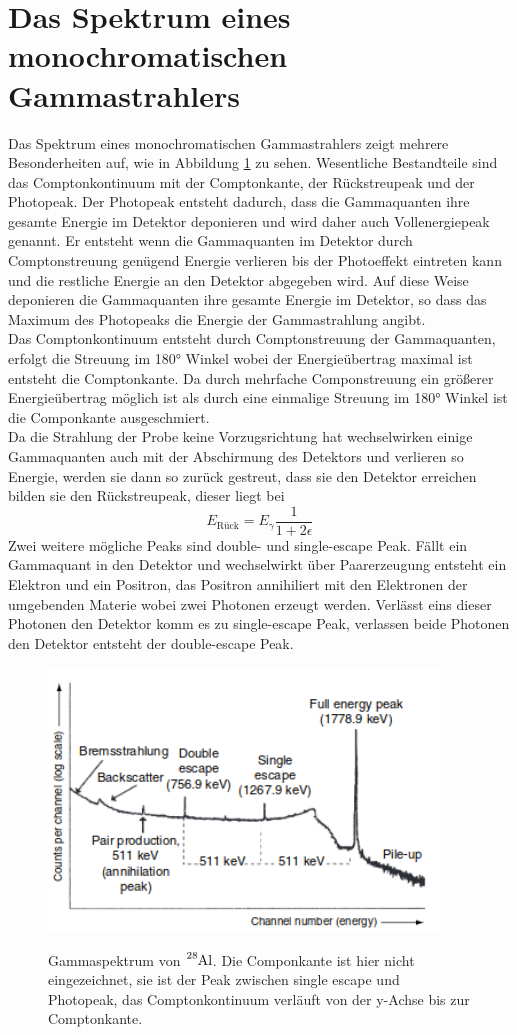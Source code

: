 \section{Das Spektrum eines monochromatischen Gammastrahlers}
Das Spektrum eines monochromatischen Gammastrahlers zeigt mehrere Besonderheiten auf, wie in Abbildung \ref{fig:Spektrum} zu
sehen. Wesentliche Bestandteile sind das Comptonkontinuum mit der Comptonkante, der Rückstreupeak
und der Photopeak. Der Photopeak entsteht dadurch, dass die Gammaquanten ihre gesamte Energie im Detektor deponieren
und wird daher auch Vollenergiepeak genannt. Er entsteht wenn die Gammaquanten im Detektor durch
Comptonstreuung genügend Energie verlieren bis der Photoeffekt eintreten kann und die restliche Energie
an den Detektor abgegeben wird. Auf diese Weise deponieren die Gammaquanten ihre gesamte Energie im
Detektor, so dass das Maximum des Photopeaks die Energie der Gammastrahlung angibt.\\
Das Comptonkontinuum entsteht durch Comptonstreuung der Gammaquanten, erfolgt die Streuung im
180° Winkel wobei der Energieübertrag maximal ist entsteht die Comptonkante. Da durch mehrfache
Componstreuung ein größerer Energieübertrag möglich ist als durch eine einmalige Streuung im 180° Winkel ist die
Componkante ausgeschmiert.\\
Da die Strahlung der Probe keine Vorzugsrichtung hat wechselwirken einige Gammaquanten auch mit der
Abschirmung des Detektors und verlieren so Energie, werden sie dann so zurück gestreut, dass sie den
Detektor erreichen bilden sie den Rückstreupeak, dieser liegt bei
\begin{equation}
  E_{\text{Rück}}=E_{\gamma}\frac{1}{1+2\epsilon}
  \label{eqn:Rückstreu}
\end{equation}
Zwei weitere mögliche Peaks sind double- und single-escape Peak. Fällt ein Gammaquant in den Detektor und wechselwirkt über
Paarerzeugung entsteht ein Elektron und ein Positron, das Positron annihiliert mit den Elektronen der umgebenden Materie wobei
zwei Photonen erzeugt werden. Verlässt eins dieser Photonen den Detektor komm es zu single-escape Peak, verlassen beide
Photonen den Detektor entsteht der double-escape Peak.
\cite{Gilmore2}


\begin{figure}
  \centering
  \includegraphics[height=7cm]{Spektrum.png}
  \caption{Gammaspektrum von $\ce{^{28}Al}$. Die Componkante ist hier nicht eingezeichnet, sie ist der Peak zwischen single escape und Photopeak,
  das Comptonkontinuum verläuft von der y-Achse bis zur Comptonkante.}\cite{Gilmore2}
  \label{fig:Spektrum}
\end{figure}
